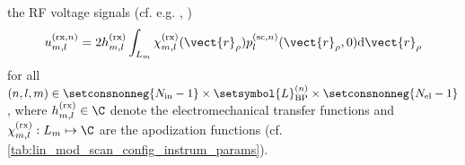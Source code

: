 the \ac{RF} voltage signals
(cf. e.g.
\cite[Sect. 9.2]{book:Schmerr2015},
\cite{article:LabyedITUFFC2014,article:NgITUFFC2006,article:JensenJASA1991}%
)
\begin{equation}
  u_{m, l}^{(\text{rx}, n)}
  =
  2 h_{m, l}^{(\text{rx})}
  \int_{ L_{m} }
    \chi_{m, l}^{(\text{rx})}( \vect{r}_{\rho} )
    p_{l}^{(\text{sc}, n)}( \vect{r}_{\rho}, 0 )
  \text{d} \vect{r}_{\rho}
 \label{eqn:lin_mod_scan_config_trans_array_transfer_v_rx}
\end{equation}
for
all $( n, l, m ) \in \setconsnonneg{ N_{\text{in}} - 1 } \times \setsymbol{L}_{ \text{BP} }^{(n)} \times \setconsnonneg{ N_{\text{el}} - 1 }$, where
$h_{m, l}^{(\text{rx})} \in \C$ denote
the electromechanical transfer functions and
$\chi_{m, l}^{(\text{rx})}: L_{m} \mapsto \C$ are
the apodization functions
(cf. \cref{tab:lin_mod_scan_config_instrum_params}).

